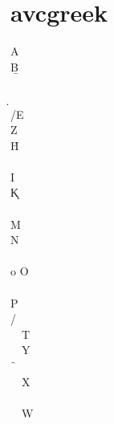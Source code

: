 \newpage
\section*{avcgreek}\noindent
  \a         A   \\
  \b         B   \\
  \g        \G   \\
  \d        \D   \\
  \e/\ev     E   \\
  \z         Z   \\
  \h         H   \\
  \th       \Th  \\
  \io        I   \\
  \k         K   \\
  \la       \La  \\
  \mu        M   \\
  \nu        N   \\
  \xi       \Xi  \\
   o         O   \\
  \pi       \Pi  \\
  \rh        P   \\
  \si/\siv  \Si  \\
  \ta        T   \\
  \up        Y   \\
  \f        \F   \\
  \x         X   \\
  \y        \Y   \\
  \w        \W   \\

